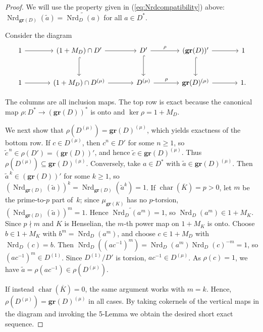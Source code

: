 \documentclass[10pt,a4paper]{amsart}
\newcommand{\Dmu}{D^{(\mu)}}
\newcommand{\Nrd}{\opn{Nrd}}
\newcommand{\gr}{\mathbf{gr}}
\newcommand{\opn}{\operatorname}
\newcommand{\upmu}{{(\mu)}}
\begin{document}
\begin{proof}
We will use  the property  given in (\ref{eq:Nrdcompatibility}) above:  $\operatorname{Nrd}_{\gr(D)}(\widetilde a)=\widetilde{\operatorname{Nrd}_D(a)}$ for all $a\in D^*$.

 Consider the diagram
$$
\begin{tikzcd}[column sep=large,row sep=large]
1 \arrow[r]
& (1+M_D)\cap D' \arrow[r] \arrow[d,hook]
& D' \arrow[r,"\rho"] \arrow[d,hook]
& (\gr(D))' \arrow[r] \arrow[d,hook]
& 1 \\
1 \arrow[r]
& (1+M_D)\cap \Dmu \arrow[r]
& \Dmu  \arrow[r,"\rho"]
& \gr(D)^{(\mu)} \arrow[r]
& 1 .
\end{tikzcd}
$$

The columns are all inclusion maps.
The top row is exact because the canonical map ${\rho\colon D^*\to(\gr(D))^*}$ is onto and $\ker\rho=1+M_D$. 

We next show that 
$\rho(\Dmu)=\gr(D)^{(\mu)}$, which yields exactness of the bottom row.
If ${c\in \Dmu}$, then $c^n\in D'$ for some $n\ge 1$, so $\widetilde c^{\,n}\in\rho(D')=(\gr(D))'$, 
and hence $\widetilde c\in \gr(D)^\upmu$. Thus 
${\rho(\Dmu)\subseteq \gr(D)^\upmu}$. Conversely, take $a\in D^*$ with 
$\widetilde a\in \gr(D)^\upmu$. Then $\widetilde a^{\,k}\in(\gr(D))'$ 
for some $k\geq1$, so $(\Nrd_{\gr(D)}(\widetilde a))^k = \Nrd_{\gr(D)}(\widetilde a^k)=1$. 
If $\operatorname{char}(\overline K)=p>0$, 
let $m$ be the prime-to-$p$ part of~$k$; since $\mu_{\gr(K)}$ has no $p$-torsion, $(\Nrd_{\gr(D)}(\widetilde a))^m=1$. 
Hence $\widetilde{\Nrd_D(a^m)}=1$, so $\operatorname{Nrd}_D(a^m)\in1+M_K$. Since $p\nmid m$ and 
$K$ is Henselian, the $m$-th power map on $1+M_K$ is onto. Choose $b\in1+M_K$ with $b^m=\Nrd_D(a^m)$, and 
choose $c\in1+M_D$ with $\Nrd_D(c)=b$. Then $\Nrd_D((ac^{-1})^m) =\Nrd_D(a^m)\Nrd_D(c)^{-m}=1$, 
so $(ac^{-1})^m\in D^{(1)}$. Since $D^{(1)}/D'$ is torsion, $ac^{-1}\in \Dmu$. As $\rho(c)=1$, we have 
$\widetilde a=\rho(ac^{-1})\in\rho(\Dmu)$.

If instead $\operatorname{char}(\overline K)=0$, the same argument works with $m=k$. Hence, 
$\rho(\Dmu)= \gr(D)^\upmu$
in all cases.
By taking cokernels of the vertical maps in the diagram and invoking the 5-Lemma we obtain the desired short exact 
sequence. \end{proof}
\end{document}

